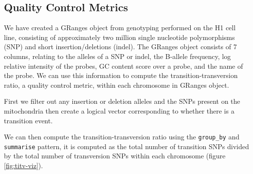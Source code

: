 \documentclass[10pt,letterpaper]{article}
\newenvironment{Shaded}{\begin{snugshade}}{\end{snugshade}}
\newcommand{\DataTypeTok}[1]{\textcolor[rgb]{0.13,0.29,0.53}{#1}}
\newcommand{\KeywordTok}[1]{\textcolor[rgb]{0.13,0.29,0.53}{\textbf{#1}}}
\newcommand{\NormalTok}[1]{#1}
\newcommand{\OperatorTok}[1]{\textcolor[rgb]{0.81,0.36,0.00}{\textbf{#1}}}
\newcommand{\StringTok}[1]{\textcolor[rgb]{0.31,0.60,0.02}{#1}}
\begin{document}
\hypertarget{quality-control-metrics}{%
\subsection{Quality Control Metrics}\label{quality-control-metrics}}

We have created a GRanges object from genotyping performed on the H1
cell line, consisting of approximately two million single nucleotide
polymorphisms (SNP) and short insertion/deletions (indel). The GRanges
object consists of 7 columns, relating to the alleles of a SNP or indel,
the B-allele frequency, log relative intensity of the probes, GC content
score over a probe, and the name of the probe. We can use this
information to compute the transition-transversion ratio, a quality
control metric, within each chromosome in GRanges object.

First we filter out any insertion or deletion alleles and the SNPs
present on the mitochondria then create a logical vector corresponding
to whether there is a transition event.

\begin{Shaded}
\end{Shaded}

We can then compute the transition-transversion ratio using the
\texttt{group\_by} and \texttt{summarise} pattern, it is computed as the
total number of transition SNPs divided by the total number of
transversion SNPs within each chromosome (figure \ref{fig:titv-viz}).
\end{document}

